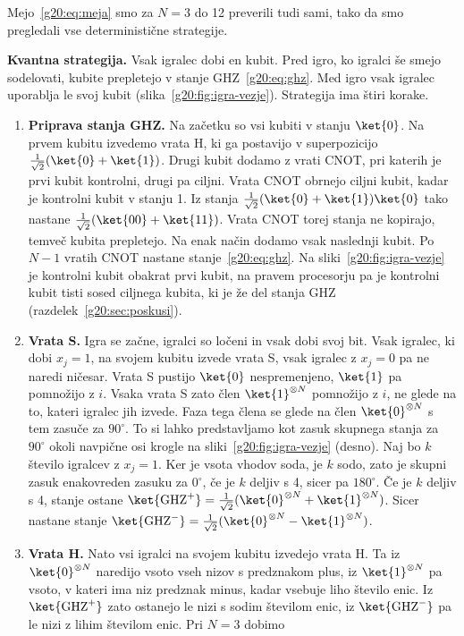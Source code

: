 Mejo~\eqref{g20:eq:meja} smo za $N=3$ do 12 preverili tudi sami, tako da smo pregledali vse deterministične strategije.

\textbf{Kvantna strategija.} Vsak igralec dobi en kubit. Pred igro, ko igralci še smejo sodelovati, kubite prepletejo v stanje GHZ~\eqref{g20:eq:ghz}. Med igro vsak igralec uporablja le svoj kubit (slika~\ref{g20:fig:igra-vezje}). Strategija ima štiri korake.
\begin{enumerate}
\item \textbf{Priprava stanja GHZ.} Na začetku so vsi kubiti v stanju $\ket{0}$. Na prvem kubitu izvedemo vrata H, ki ga postavijo v superpozicijo $\tfrac{1}{\sqrt2}(\ket{0}+\ket{1})$. Drugi kubit dodamo z vrati CNOT, pri katerih je prvi kubit kontrolni, drugi pa ciljni. Vrata CNOT obrnejo ciljni kubit, kadar je kontrolni kubit v stanju 1. Iz stanja $\tfrac{1}{\sqrt2}(\ket{0}+\ket{1})\ket{0}$ tako nastane $\tfrac{1}{\sqrt2}(\ket{00}+\ket{11})$. Vrata CNOT torej stanja ne kopirajo, temveč kubita prepletejo. Na enak način dodamo vsak naslednji kubit. Po $N-1$ vratih CNOT nastane stanje~\eqref{g20:eq:ghz}. Na sliki~\ref{g20:fig:igra-vezje} je kontrolni kubit obakrat prvi kubit, na pravem procesorju pa je kontrolni kubit tisti sosed ciljnega kubita, ki je že del stanja GHZ (razdelek~\ref{g20:sec:poskusi}).
\item \textbf{Vrata S.} Igra se začne, igralci so ločeni in vsak dobi svoj bit. Vsak igralec, ki dobi $x_j=1$, na svojem kubitu izvede vrata S, vsak igralec z $x_j=0$ pa ne naredi ničesar. Vrata S pustijo $\ket{0}$ nespremenjeno, $\ket{1}$ pa pomnožijo z $i$. Vsaka vrata S zato člen $\ket{1}^{\otimes N}$ pomnožijo z $i$, ne glede na to, kateri igralec jih izvede. Faza tega člena se glede na člen $\ket{0}^{\otimes N}$ s tem zasuče za $90^\circ$. To si lahko predstavljamo kot zasuk skupnega stanja za $90^\circ$ okoli navpične osi krogle na sliki~\ref{g20:fig:igra-vezje} (desno). Naj bo $k$ število igralcev z $x_j=1$. Ker je vsota vhodov soda, je $k$ sodo, zato je skupni zasuk enakovreden zasuku za $0^\circ$, če je $k$ deljiv s 4, sicer pa $180^\circ$. Če je $k$ deljiv s 4, stanje ostane $\ket{\mathrm{GHZ}^+}=\tfrac{1}{\sqrt2}(\ket{0}^{\otimes N}+\ket{1}^{\otimes N})$. Sicer nastane stanje $\ket{\mathrm{GHZ}^-}=\tfrac{1}{\sqrt2}(\ket{0}^{\otimes N}-\ket{1}^{\otimes N})$.
\item \textbf{Vrata H.} Nato vsi igralci na svojem kubitu izvedejo vrata H. Ta iz $\ket{0}^{\otimes N}$ naredijo vsoto vseh nizov s predznakom plus, iz $\ket{1}^{\otimes N}$ pa vsoto, v kateri ima niz predznak minus, kadar vsebuje liho število enic. Iz $\ket{\mathrm{GHZ}^+}$ zato ostanejo le nizi s sodim številom enic, iz $\ket{\mathrm{GHZ}^-}$ pa le nizi z lihim številom enic. Pri $N=3$ dobimo

\end{enumerate}
